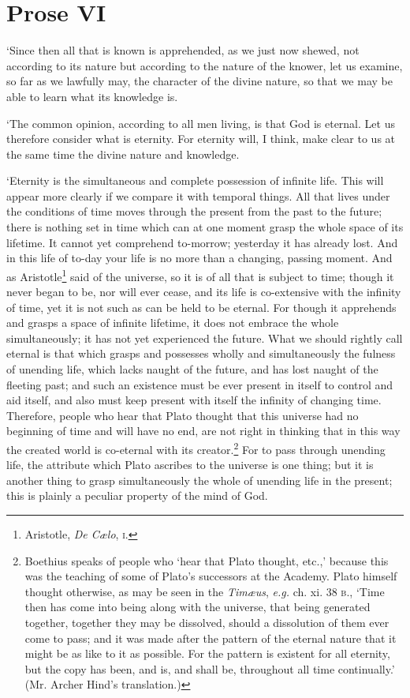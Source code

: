 \section{Prose VI}

`Since then all that is known is apprehended, as we just now shewed,
not according to its nature but according to the nature of the knower,
let us examine, so far as we lawfully may, the character of the divine
nature, so that we may be able to learn what its knowledge is.

`The common opinion, according to all men living, is that God is
eternal. Let us therefore consider what is eternity. For eternity
will, I think, make clear to us at the same time the divine nature and
knowledge.

`Eternity is the simultaneous and complete possession of infinite
life. This will appear more clearly if we compare it with temporal
 things. All that lives under the conditions of time moves
through the present from the past to the future; there is nothing set
in time which can at one moment grasp the whole space of its lifetime.
It cannot yet comprehend to-morrow; yesterday it has already lost. And
in this life of to-day your life is no more than a changing, passing
moment. And as Aristotle\footnote{Aristotle, \textit{De C\ae lo},
\textsc{i}.} said of the universe, so it is of all that is subject to
time; though it never began to be, nor will ever cease, and its life
is co-extensive with the infinity of time, yet it is not such as can
be held to be eternal. For though it apprehends and grasps a space of
infinite lifetime, it does not embrace the whole simultaneously; it
has not yet experienced the future. What we should rightly call
eternal is that which grasps and possesses wholly and simultaneously
the fulness of unending life, which lacks naught of the future, and
has lost naught of the fleeting past; and such an existence must be
ever present in itself to control and aid itself, and also must keep
present with itself the infinity of changing time. Therefore, people
who hear that Plato thought that this universe had no beginning of
time and will have no end, are not right in thinking that in this way
the created world is co-eternal with its creator.\footnote{Boethius
speaks of people who `hear that Plato thought, etc.,' because this was
the teaching of some of Plato's successors at the Academy. Plato
himself thought otherwise, as may be seen in the \textit{Tim\ae us},
\textit{e.g.} ch. xi. 38 \textsc{b}., `Time then has come into being
along with the universe, that being generated together, together they
may be dissolved, should a dissolution of them ever come to pass; and
it was made after the pattern of the eternal nature that it might be
as like to it as possible. For the pattern is existent for all
eternity, but the copy has been, and is, and shall be, throughout all
time continually.' (Mr. Archer Hind's translation.)}  For to
pass through unending life, the attribute which Plato ascribes to the
universe is one thing; but it is another thing to grasp simultaneously
the whole of unending life in the present; this is plainly a peculiar
property of the mind of God.

